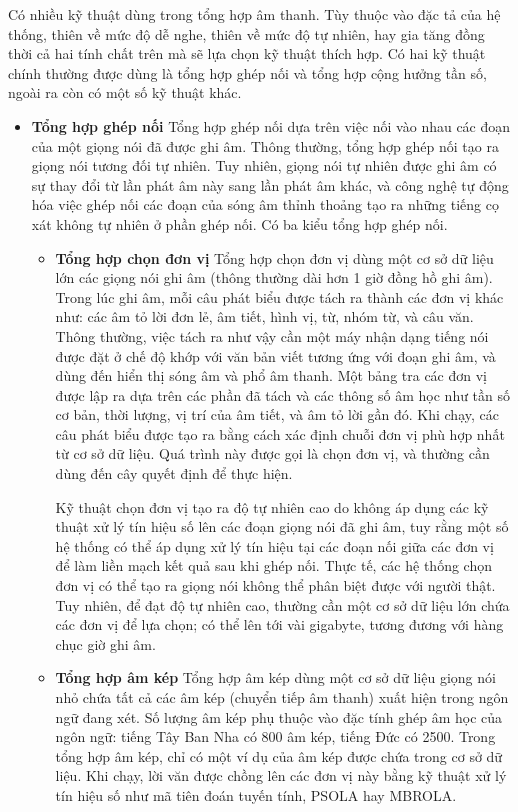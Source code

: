 Có nhiều kỹ thuật dùng trong tổng hợp âm thanh. Tùy thuộc vào đặc tả của hệ thống, thiên về mức độ dễ nghe, thiên về mức độ tự nhiên, hay gia tăng đồng thời cả hai tính chất trên mà sẽ lựa chọn kỹ thuật thích hợp. Có hai kỹ thuật chính thường được dùng là tổng hợp ghép nối và tổng hợp cộng hưởng tần số, ngoài ra còn có một số kỹ thuật khác.
\begin{itemize}
\item \textbf{Tổng hợp ghép nối}
Tổng hợp ghép nối dựa trên việc nối vào nhau các đoạn của một giọng nói đã được ghi âm. Thông thường, tổng hợp ghép nối tạo ra giọng nói tương đối tự nhiên. Tuy nhiên, giọng nói tự nhiên được ghi âm có sự thay đổi từ lần phát âm này sang lần phát âm khác, và công nghệ tự động hóa việc ghép nối các đoạn của sóng âm thỉnh thoảng tạo ra những tiếng cọ xát không tự nhiên ở phần ghép nối. Có ba kiểu tổng hợp ghép nối.
\begin{itemize}
\item \textbf{Tổng hợp chọn đơn vị}
Tổng hợp chọn đơn vị dùng một cơ sở dữ liệu lớn các giọng nói ghi âm (thông thường dài hơn 1 giờ đồng hồ ghi âm). Trong lúc ghi âm, mỗi câu phát biểu được tách ra thành các đơn vị khác như: các âm tỏ lời đơn lẻ, âm tiết, hình vị, từ, nhóm từ, và câu văn. Thông thường, việc tách ra như vậy cần một máy nhận dạng tiếng nói được đặt ở chế độ khớp với văn bản viết tương ứng với đoạn ghi âm, và dùng đến hiển thị sóng âm và phổ âm thanh. Một bảng tra các đơn vị được lập ra dựa trên các phần đã tách và các thông số âm học như tần số cơ bản, thời lượng, vị trí của âm tiết, và âm tỏ lời gần đó. Khi chạy, các câu phát biểu được tạo ra bằng cách xác định chuỗi đơn vị phù hợp nhất từ cơ sở dữ liệu. Quá trình này được gọi là chọn đơn vị, và thường cần dùng đến cây quyết định để thực hiện.

Kỹ thuật chọn đơn vị tạo ra độ tự nhiên cao do không áp dụng các kỹ thuật xử lý tín hiệu số lên các đoạn giọng nói đã ghi âm, tuy rằng một số hệ thống có thể áp dụng xử lý tín hiệu tại các đoạn nối giữa các đơn vị để làm liền mạch kết quả sau khi ghép nối. Thực tế, các hệ thống chọn đơn vị có thể tạo ra giọng nói không thể phân biệt được với người thật. Tuy nhiên, để đạt độ tự nhiên cao, thường cần một cơ sở dữ liệu lớn chứa các đơn vị để lựa chọn; có thể lên tới vài gigabyte, tương đương với hàng chục giờ ghi âm.

\item \textbf{Tổng hợp âm kép}
Tổng hợp âm kép dùng một cơ sở dữ liệu giọng nói nhỏ chứa tất cả các âm kép (chuyển tiếp âm thanh) xuất hiện trong ngôn ngữ đang xét. Số lượng âm kép phụ thuộc vào đặc tính ghép âm học của ngôn ngữ: tiếng Tây Ban Nha có 800 âm kép, tiếng Đức có 2500. Trong tổng hợp âm kép, chỉ có một ví dụ của âm kép được chứa trong cơ sở dữ liệu. Khi chạy, lời văn được chồng lên các đơn vị này bằng kỹ thuật xử lý tín hiệu số như mã tiên đoán tuyến tính, PSOLA hay MBROLA.


\end{itemize}
\end{itemize}
